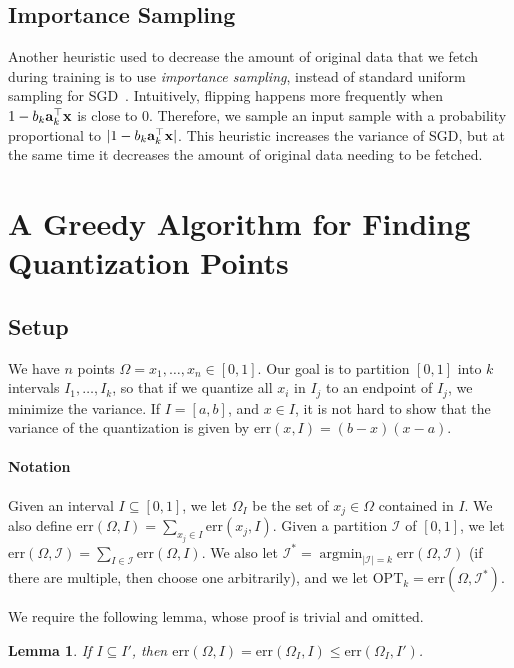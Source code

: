 \documentclass{article}
\def\a{{\bf a}}
\def\x{{\bf x}}
\newcommand{\err}{\ensuremath{\mathrm{err}}}
\newcommand{\setX}{\Omega}
\newcommand{\setI}{\mathcal{I}}
\newcommand{\OPT}{\ensuremath{\mathrm{OPT}}}
\DeclareMathOperator*{\argmin}{argmin}
\newtheorem{lemma}{Lemma}
\newcommand{\todo}[1]{\noindent \textbf{[TODO:] #1 } }
\begin{document}
\subsection{Importance Sampling}  Another heuristic
 used to decrease the amount of original data that
we fetch during training is to use {\em importance
sampling}, instead of standard uniform sampling for SGD~\cite{ImportantSampling}. 
Intuitively, flipping happens more frequently
when $1 - b_k \a_k^\top \x$ is close to 0.
Therefore, we sample an input sample
with a probability proportional to 
$|1 - b_k \a_k^\top \x|$. This heuristic 
increases the variance of SGD, 
but at the same time it decreases the amount of original data
needing to be fetched. 




\section{A Greedy Algorithm for Finding Quantization Points}
\subsection{Setup}
We have $n$ points $\setX = x_1, \ldots, x_n \in [0, 1]$.
Our goal is to partition $[0, 1]$ into $k$ intervals $I_1, \ldots, I_k$, so that if we quantize all $x_i$ in $I_j$ to an endpoint of $I_j$, we minimize the variance.
If $I = [a, b]$, and $x \in I$, it is not hard to show that the variance of the quantization is given by $\err (x, I) = (b - x) (x - a)$.

\paragraph{Notation} Given an interval $I \subseteq [0, 1]$, we let $\setX_I$ be the set of $x_j \in \setX$ contained in $I$.
We also define $\err (\setX, I) = \sum_{x_j \in I} \err (x_j, I)$.
Given a partition $\setI$ of $[0, 1]$, we let $\err (\setX, \setI) = \sum_{I \in \setI} \err (\setX, I)$.
We also let $\setI^* = \argmin_{|\setI| = k} \err (\setX, \setI)$ (if there are multiple, then choose one arbitrarily), and we let $\OPT_k = \err(\setX, \setI^*)$.

We require the following lemma, whose proof is trivial and omitted.
\begin{lemma}
\label{lem:subset}
If $I \subseteq I'$, then $\err(\setX, I) = \err (\setX_I, I) \leq \err (\setX_I, I')$.
\end{lemma}
\end{document}
